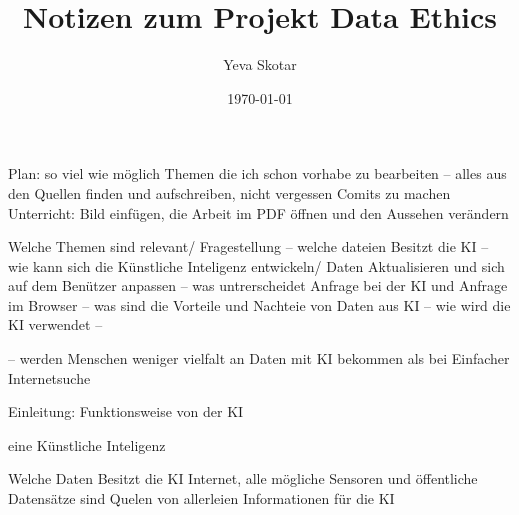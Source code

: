 \documentclass{article}
\title{Notizen zum Projekt Data Ethics}
\author{Yeva Skotar}
\date{\today}
\begin{document}
\maketitle


\tableofcontents



Plan:
so viel wie möglich Themen die ich schon vorhabe zu bearbeiten -- alles aus den Quellen finden und aufschreiben, 
nicht vergessen Comits zu machen 
Unterricht:
Bild einfügen, die Arbeit im PDF öffnen und den Aussehen verändern 

Welche Themen sind relevant/ Fragestellung
-- welche dateien Besitzt die KI
-- wie kann sich die Künstliche Inteligenz entwickeln/ Daten Aktualisieren und sich auf dem Benützer anpassen 
-- was untrerscheidet Anfrage bei der KI und Anfrage im Browser 
-- was sind die Vorteile und Nachteie von Daten aus KI 
-- wie wird die KI verwendet
--  

-- werden Menschen weniger vielfalt an Daten mit KI bekommen als bei Einfacher Internetsuche 

Einleitung: Funktionsweise von der KI 


eine Künstliche Inteligenz 

Welche Daten Besitzt die KI 
Internet, alle mögliche Sensoren und öffentliche Datensätze sind Quelen von allerleien Informationen 
für die KI 
\end{document}
